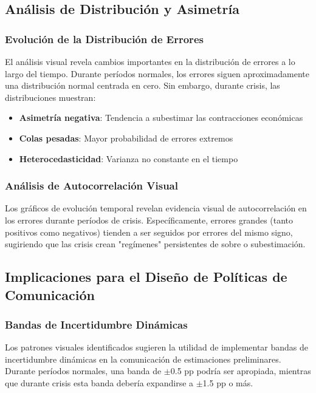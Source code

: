 \documentclass{article}
\begin{document}
\subsection{Análisis de Distribución y Asimetría}

\subsubsection{Evolución de la Distribución de Errores}

El análisis visual revela cambios importantes en la distribución de errores a lo largo del tiempo. Durante períodos normales, los errores siguen aproximadamente una distribución normal centrada en cero. Sin embargo, durante crisis, las distribuciones muestran:

\begin{itemize}
\item \textbf{Asimetría negativa}: Tendencia a subestimar las contracciones económicas
\item \textbf{Colas pesadas}: Mayor probabilidad de errores extremos
\item \textbf{Heterocedasticidad}: Varianza no constante en el tiempo
\end{itemize}

\subsubsection{Análisis de Autocorrelación Visual}

Los gráficos de evolución temporal revelan evidencia visual de autocorrelación en los errores durante períodos de crisis. Específicamente, errores grandes (tanto positivos como negativos) tienden a ser seguidos por errores del mismo signo, sugiriendo que las crisis crean "regímenes" persistentes de sobre o subestimación.

\subsection{Implicaciones para el Diseño de Políticas de Comunicación}

\subsubsection{Bandas de Incertidumbre Dinámicas}

Los patrones visuales identificados sugieren la utilidad de implementar bandas de incertidumbre dinámicas en la comunicación de estimaciones preliminares. Durante períodos normales, una banda de $\pm$0.5 pp podría ser apropiada, mientras que durante crisis esta banda debería expandirse a $\pm$1.5 pp o más.
\end{document}
